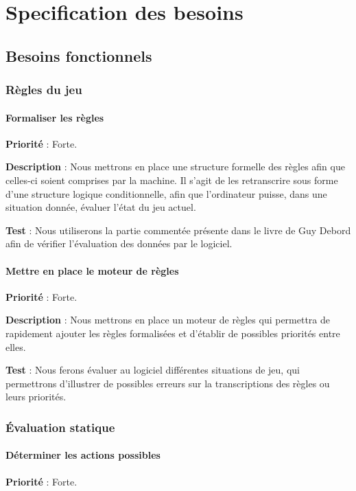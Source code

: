 \chapter{Specification des besoins}
	\section{Besoins fonctionnels}
  
     	\subsection{Règles du jeu}
			\subsubsection{Formaliser les règles}
			
			\textbf{Priorité} : Forte.
			
			\textbf{Description} : Nous mettrons en place une structure formelle des règles afin que celles-ci soient comprises par la machine. Il s'agit de les retranscrire sous forme d'une structure logique conditionnelle, afin que l'ordinateur puisse, dans une situation donnée, évaluer l'état du jeu actuel.
			
			\textbf{Test} : Nous utiliserons la partie commentée présente dans le livre de Guy Debord afin de vérifier l'évaluation des données par le logiciel.
			
			
			\subsubsection{Mettre en place le moteur de règles}
			
			\textbf{Priorité} : Forte.
			
			\textbf{Description} : Nous mettrons en place un moteur de règles qui permettra de rapidement ajouter les règles formalisées et d'établir de possibles priorités entre elles.
			
			\textbf{Test} : Nous ferons évaluer au logiciel différentes situations de jeu, qui permettrons d'illustrer de possibles erreurs sur la transcriptions des règles ou leurs priorités.
		\subsection{Évaluation statique}
			\subsubsection{Déterminer les actions possibles}
			\textbf{Priorité} : Forte.
			

